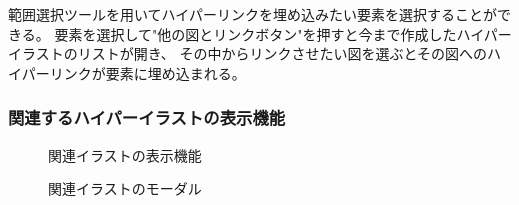 範囲選択ツールを用いてハイパーリンクを埋め込みたい要素を選択することができる。
要素を選択して"他の図とリンクボタン"を押すと今まで作成したハイパーイラストのリストが開き、
その中からリンクさせたい図を選ぶとその図へのハイパーリンクが要素に埋め込まれる。

\subsubsection{関連するハイパーイラストの表示機能}


\begin{figure}[htbp] \begin{minipage}{0.5\hsize}
                         \begin{center} 
                         \end{center} \caption{関連イラストの表示機能} \label{fig:linkedIllust1}
\end{minipage} \begin{minipage}{0.5\hsize}
                   \begin{center} 
                   \end{center} \caption{関連イラストのモーダル} \label{fig:linkedIllust2}
\end{minipage}
\end{figure}

